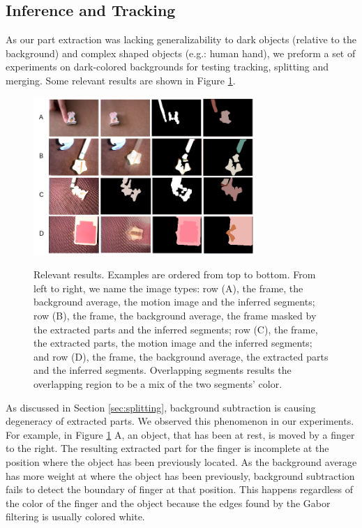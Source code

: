 \documentclass{article}
\begin{document}
\subsection{Inference and Tracking}

As our part extraction was lacking generalizability to dark objects (relative to the background) and complex shaped objects (e.g.: human hand), we preform a set of experiments on dark-colored backgrounds for testing tracking, splitting and merging. Some relevant results are shown in Figure \ref{figure:res}. 

\begin{figure}[tbp]
\begin{center}
\caption{Relevant results. Examples are ordered from top to bottom. From left to right, we name the image types: row (A), the frame, the background average, the motion image and the inferred segments; row (B), the frame, the background average, the frame masked by the extracted parts and the inferred segments; row (C), the frame, the extracted parts, the motion image and the inferred segments; and row (D), the frame, the background average, the extracted parts and the inferred segments. Overlapping segments results the overlapping region to be a mix of the two segments' color.}
  \includegraphics[width=0.75\textwidth]{7}
\label{figure:res}
\end{center}
\end{figure}

As discussed in Section \ref{sec:splitting}, background subtraction is causing degeneracy of extracted parts. We observed this phenomenon in our experiments. For example, in Figure \ref{figure:res} A, an object, that has been at rest, is moved by a finger to the right. The resulting extracted part for the finger is incomplete at the position where the object has been previously located. As the background average has more weight at where the object has been previously, background subtraction fails to detect the boundary of finger at that position. This happens regardless of the color of the finger and the object because the edges found by the Gabor filtering is usually colored white.
\end{document}
